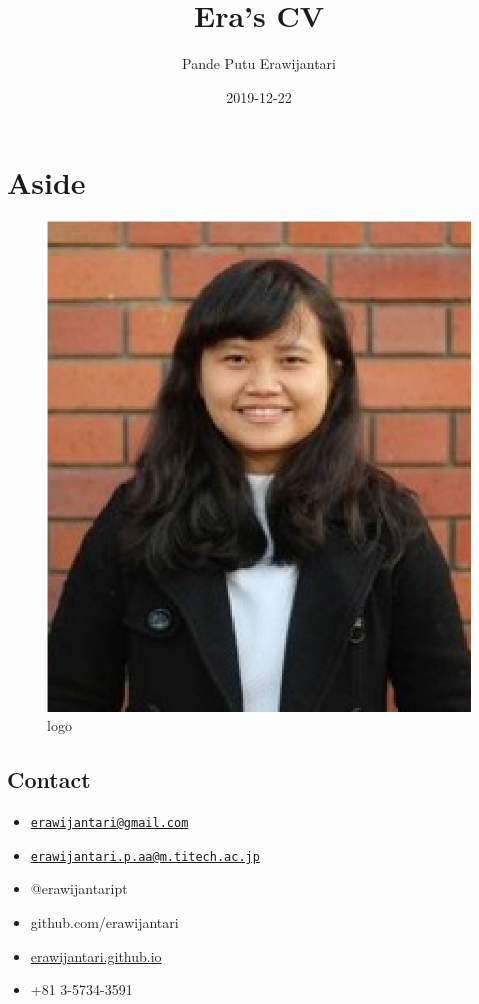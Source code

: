 \documentclass[]{article}
\title{Era's CV}
\author{Pande Putu Erawijantari}
\date{2019-12-22}
\providecommand{\tightlist}{%
  \setlength{\itemsep}{0pt}\setlength{\parskip}{0pt}}
\begin{document}
\maketitle

\hypertarget{aside}{%
\section{Aside}\label{aside}}

\begin{figure}
\centering
\includegraphics[width=1\textwidth,height=\textheight]{era_fig.jpg}
\caption{logo}
\end{figure}

\hypertarget{contact}{%
\subsection{Contact}\label{contact}}

\begin{itemize}
\tightlist
\item

  \href{mailto:erawijantari@gmail.com}{\nolinkurl{erawijantari@gmail.com}}
\item

  \href{mailto:erawijantari.p.aa@m.titech.ac.jp}{\nolinkurl{erawijantari.p.aa@m.titech.ac.jp}}
\item
   @erawijantaript
\item
   github.com/erawijantari
\item
   \url{erawijantari.github.io}
\item
   +81 3-5734-3591
\end{itemize}
\end{document}
